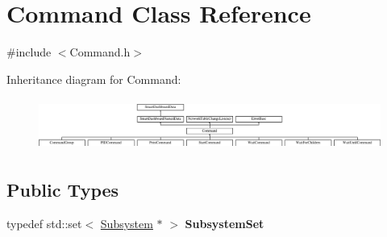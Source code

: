 \hypertarget{classCommand}{
\section{Command Class Reference}
\label{classCommand}
}


{\ttfamily \#include $<$Command.h$>$}

Inheritance diagram for Command:\begin{figure}[H]
\begin{center}
\leavevmode
\includegraphics[height=1.720430cm]{classCommand}
\end{center}
\end{figure}
\subsection*{Public Types}
\begin{DoxyCompactItemize}
\item 
\hypertarget{classCommand_a189a03bfe86bc5cf292994ba141a8b25}{
typedef std::set$<$ \hyperlink{classSubsystem}{Subsystem} $\ast$ $>$ {\bfseries SubsystemSet}}
\label{classCommand_a189a03bfe86bc5cf292994ba141a8b25}

\end{DoxyCompactItemize}
